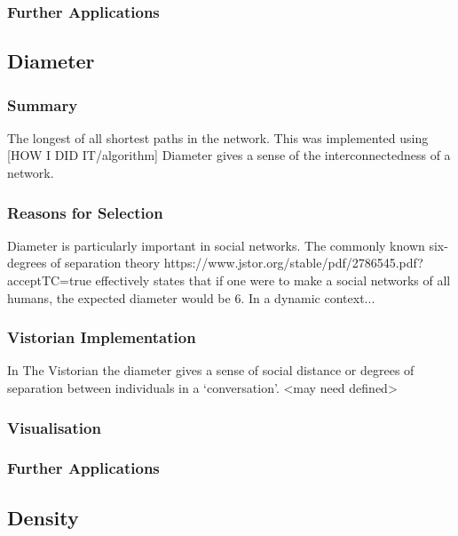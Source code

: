 \subsubsection{Further Applications}

\subsection{Diameter}
\subsubsection{Summary}
The longest of all shortest paths in the network. This was implemented using [HOW I DID IT/algorithm] Diameter gives a sense of the interconnectedness of a network.

\subsubsection{Reasons for Selection}
Diameter is particularly important in social networks. The commonly known six-degrees of separation theory https://www.jstor.org/stable/pdf/2786545.pdf?acceptTC=true effectively states that if one were to make a social networks of all humans, the expected diameter would be 6. In a dynamic context... 

\subsubsection{Vistorian Implementation}
In The Vistorian the diameter gives a sense of social distance or degrees of separation between individuals in a ‘conversation’. <may need defined> 
\subsubsection{Visualisation}
\subsubsection{Further Applications}

\subsection{Density}
